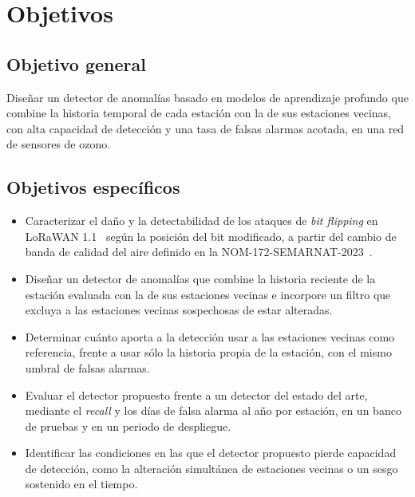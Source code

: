 \section{Objetivos}

\subsection{Objetivo general}

Diseñar un detector de anomalías basado en modelos de aprendizaje profundo que combine la historia temporal de cada estación con la de sus estaciones vecinas, con alta capacidad de detección y una tasa de falsas alarmas acotada, en una red de sensores de ozono.

\subsection{Objetivos específicos}
\begin{itemize}
    \item[$\bullet$] Caracterizar el daño y la detectabilidad de los ataques de \textit{bit flipping} en LoRaWAN 1.1~\cite{loraalliance2017lorawan11} según la posición del bit modificado, a partir del cambio de banda de calidad del aire definido en la NOM-172-SEMARNAT-2023~\cite{nom172_semarnat_2024}.

    \item[$\bullet$] Diseñar un detector de anomalías que combine la historia reciente de la estación evaluada con la de sus estaciones vecinas e incorpore un filtro que excluya a las estaciones vecinas sospechosas de estar alteradas.

    \item[$\bullet$] Determinar cuánto aporta a la detección usar a las estaciones vecinas como referencia, frente a usar sólo la historia propia de la estación, con el mismo umbral de falsas alarmas.

    \item[$\bullet$] Evaluar el detector propuesto frente a un detector del estado del arte, mediante el \textit{recall} y los días de falsa alarma al año por estación, en un banco de pruebas y en un periodo de despliegue.

    \item[$\bullet$] Identificar las condiciones en las que el detector propuesto pierde capacidad de detección, como la alteración simultánea de estaciones vecinas o un sesgo sostenido en el tiempo.
\end{itemize}

